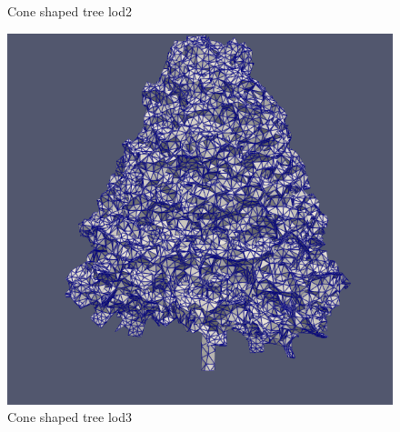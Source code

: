 \documentclass[12pt]{article}
\begin{document}
\begin{figure}[H]
\begin{minipage}{0.30\textwidth}
        \caption{Cone shaped tree lod2}
    \end{minipage}
    \begin{minipage}{0.30\textwidth}
        \centering
        \includegraphics[width=1\textwidth]{images/tree-cone_lod3.png}
        \caption{Cone shaped tree lod3}
    \end{minipage}
\end{figure}
\end{document}
